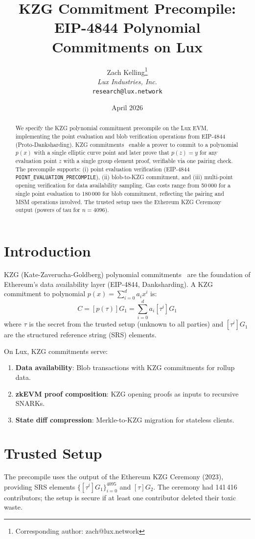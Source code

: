 \documentclass[11pt,a4paper]{article}
\title{KZG Commitment Precompile:\\EIP-4844 Polynomial Commitments on Lux}
\author{
Zach Kelling\thanks{Corresponding author: zach@lux.network}\\
\textit{Lux Industries, Inc.}\\
\texttt{research@lux.network}
}
\date{April 2026}
\begin{document}
\luxcoverpage

\begin{abstract}
We specify the KZG polynomial commitment precompile on the Lux EVM, implementing
the point evaluation and blob verification operations from EIP-4844
(Proto-Danksharding). KZG commitments~\cite{kzg} enable a prover to commit to a
polynomial $p(x)$ with a single elliptic curve point and later prove that $p(z) = y$
for any evaluation point $z$ with a single group element proof, verifiable via
one pairing check. The precompile supports: (i) point evaluation verification
(EIP-4844 \texttt{POINT\_EVALUATION\_PRECOMPILE}), (ii) blob-to-KZG commitment,
and (iii) multi-point opening verification for data availability sampling.
Gas costs range from 50\,000 for a single point evaluation to 180\,000 for
blob commitment, reflecting the pairing and MSM operations involved. The
trusted setup uses the Ethereum KZG Ceremony output (powers of tau for
$n = 4096$).
\end{abstract}

\section{Introduction}

KZG (Kate-Zaverucha-Goldberg) polynomial commitments~\cite{kzg} are the
foundation of Ethereum's data availability layer (EIP-4844, Danksharding).
A KZG commitment to polynomial $p(x) = \sum_{i=0}^{d} a_i x^i$ is:
\[
  C = [p(\tau)] G_1 = \sum_{i=0}^{d} a_i [\tau^i] G_1
\]
where $\tau$ is the secret from the trusted setup (unknown to all parties) and
$[\tau^i] G_1$ are the structured reference string (SRS) elements.

On Lux, KZG commitments serve:
\begin{enumerate}[label=(\roman*)]
  \item \textbf{Data availability}: Blob transactions with KZG commitments
    for rollup data.
  \item \textbf{zkEVM proof composition}: KZG opening proofs as inputs to
    recursive SNARKs.
  \item \textbf{State diff compression}: Merkle-to-KZG migration for
    stateless clients.
\end{enumerate}

\section{Trusted Setup}

The precompile uses the output of the Ethereum KZG Ceremony (2023), providing
SRS elements $\{[\tau^i] G_1\}_{i=0}^{4095}$ and $[\tau] G_2$. The ceremony
had 141\,416 contributors; the setup is secure if at least one contributor
deleted their toxic waste.
\end{document}
